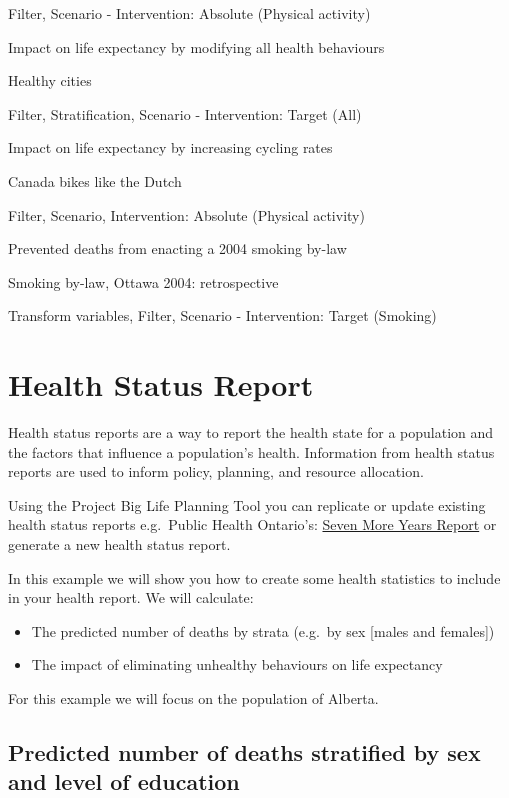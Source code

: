 \documentclass[]{book}
\providecommand{\tightlist}{%
  \setlength{\itemsep}{0pt}\setlength{\parskip}{0pt}}
\begin{document}
Filter, Scenario - Intervention: Absolute (Physical activity)

Impact on life expectancy by modifying all health behaviours

Healthy cities

Filter, Stratification, Scenario - Intervention: Target (All)

Impact on life expectancy by increasing cycling rates

Canada bikes like the Dutch

Filter, Scenario, Intervention: Absolute (Physical activity)

Prevented deaths from enacting a 2004 smoking by-law

Smoking by-law, Ottawa 2004: retrospective

Transform variables, Filter, Scenario - Intervention: Target (Smoking)

\section{Health Status Report}\label{health-status-report}

Health status reports are a way to report the health state for a
population and the factors that influence a population's health.
Information from health status reports are used to inform policy,
planning, and resource allocation.

Using the Project Big Life Planning Tool you can replicate or update
existing health status reports e.g.~Public Health Ontario's:
\href{https://www.ices.on.ca/Publications/Atlases-and-Reports/2012/Seven-More-Years}{Seven
More Years Report} or generate a new health status report.

In this example we will show you how to create some health statistics to
include in your health report. We will calculate:

\begin{itemize}
\tightlist
\item
  The predicted number of deaths by strata (e.g.~by sex {[}males and
  females{]})
\item
  The impact of eliminating unhealthy behaviours on life expectancy
\end{itemize}

For this example we will focus on the population of Alberta.

\subsection{Predicted number of deaths stratified by sex and level of
education}\label{predicted-number-of-deaths-stratified-by-sex-and-level-of-education}
\end{document}
